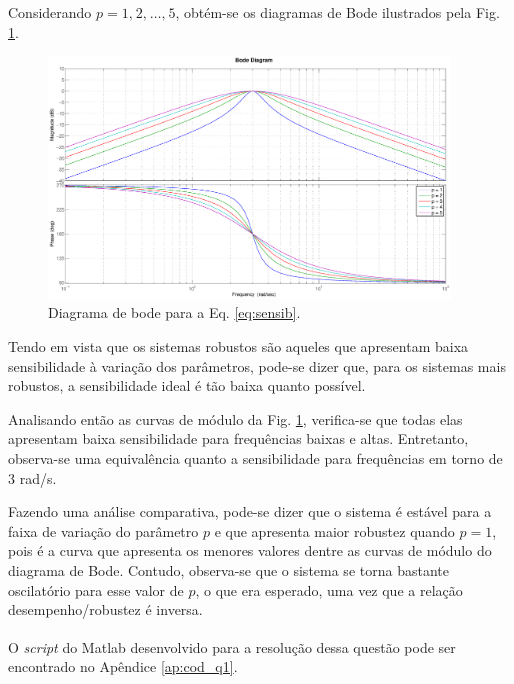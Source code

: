Considerando $p = 1\text{,}\ 2\text{,}\ \ldots\text{,}\ 5$, obtém-se os
diagramas de Bode ilustrados pela Fig. \ref{fig:diag_bode_sensib}.

\begin{figure}[H]
\centering
    \includegraphics[width=0.95\textwidth]{imgs/questao1/bode_sensib}
    \caption{Diagrama de bode para a Eq. \ref{eq:sensib}.}
    \label{fig:diag_bode_sensib}
\end{figure}

Tendo em vista que os sistemas robustos são aqueles que apresentam baixa
sensibilidade à variação dos parâmetros, pode-se dizer que, para os sistemas
mais robustos, a sensibilidade ideal é tão baixa quanto possível.

Analisando então as curvas de módulo da Fig. \ref{fig:diag_bode_sensib},
verifica-se que todas elas apresentam baixa sensibilidade para frequências
baixas e altas. Entretanto, observa-se uma equivalência quanto a sensibilidade
para frequências em torno de 3 rad/s.

Fazendo uma análise comparativa, pode-se dizer que o sistema é estável para a
faixa de variação do parâmetro $p$ e que apresenta maior robustez quando $p =
1$, pois é a curva que apresenta os menores valores dentre as curvas de módulo
do diagrama de Bode. Contudo, observa-se que o sistema se torna bastante
oscilatório para esse valor de $p$, o que era esperado, uma vez que a relação
desempenho/robustez é inversa.

O {\it script} do Matlab\textsuperscript{\textregistered} desenvolvido para a
resolução dessa questão pode ser encontrado no Apêndice \ref{ap:cod_q1}.
